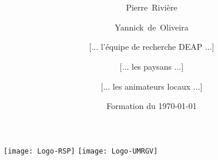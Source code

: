 


\graphicspath{{/home/pierre/Dropbox/PPB_formations_FR/figures/}}


\title[Formation Fa (RSP, INRA)] { \large \titre \\ \large \formationFa }

\author[P.Rivière]
{
\small %
\textcolor{mln-green}{Pierre~Rivière} \and
\textcolor{mln-green}{Yannick~de~Oliveira} \and
[... l'équipe de recherche DEAP ...] \and
[... les paysans ...] \and
[... les animateurs locaux ...]
}


\date[\tiny V\versionFFa~du \dateversionFFa] { \small Formation du \today }

\titlegraphic
{
\texttt{[image: Logo-RSP]}
\hspace{1cm}
\texttt{[image: Logo-UMRGV]}
}



\maketitle










% 
%



